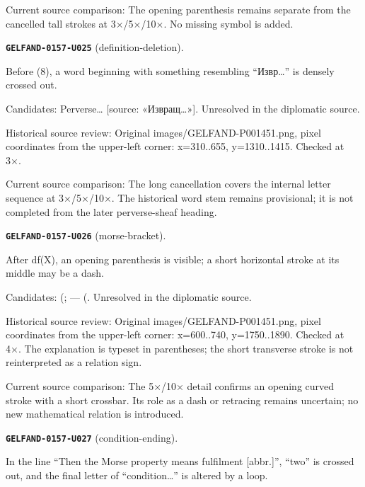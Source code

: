 Current source comparison: The opening parenthesis remains separate from the cancelled tall strokes at 3×/5×/10×. No missing symbol is added.\par\medskip
\par\noindent\leavevmode{}\label{GELFAND-0157-U025}\label{GELFAND-P001451:definition-deletion}\textbf{\texttt{GELFAND-0157-U025}} (definition-deletion).\nopagebreak[4]\par
Before (8), a word beginning with something resembling “Извр…” is densely crossed out.\par
Candidates: Perverse… [source: «Извращ…»]. Unresolved in the diplomatic source.\par
Historical source review: Original images/GELFAND-P001451.png, pixel coordinates from the upper-left corner: x=310..655, y=1310..1415. Checked at 3×.\par
Current source comparison: The long cancellation covers the internal letter sequence at 3×/5×/10×. The historical word stem remains provisional; it is not completed from the later perverse-sheaf heading.\par\medskip
\par\noindent\leavevmode{}\label{GELFAND-0157-U026}\label{GELFAND-P001451:morse-bracket}\textbf{\texttt{GELFAND-0157-U026}} (morse-bracket).\nopagebreak[4]\par
After df(X), an opening parenthesis is visible; a short horizontal stroke at its middle may be a dash.\par
Candidates: (; — (. Unresolved in the diplomatic source.\par
Historical source review: Original images/GELFAND-P001451.png, pixel coordinates from the upper-left corner: x=600..740, y=1750..1890. Checked at 4×. The explanation is typeset in parentheses; the short transverse stroke is not reinterpreted as a relation sign.\par
Current source comparison: The 5×/10× detail confirms an opening curved stroke with a short crossbar. Its role as a dash or retracing remains uncertain; no new mathematical relation is introduced.\par\medskip
\par\noindent\leavevmode{}\label{GELFAND-0157-U027}\label{GELFAND-P001451:condition-ending}\textbf{\texttt{GELFAND-0157-U027}} (condition-ending).\nopagebreak[4]\par
In the line “Then the Morse property means fulfilment [abbr.]”, “two” is crossed out, and the final letter of “condition…” is altered by a loop.\par
